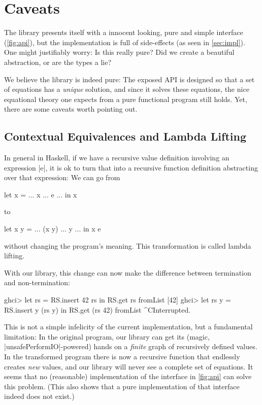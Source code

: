\documentclass[manuscript,screen,acmsmall,nonacm]{acmart}
\begin{document}
\section{Caveats}\label{sec:limitations}

The library presents itself with a innocent looking, pure and simple interface (\cref{fig:api}), but the implementation is full of side-effects (as seen in \cref{sec:impl}). One might justifiably worry: Is this really pure? Did we create a beautiful abstraction, or are the types a lie?

We believe the library is indeed pure: The exposed API is designed so that a set of equations has a \emph{unique} solution, and since it solves these equations, the nice equational theory one expects from a pure functional program still holds. Yet, there are some caveats worth pointing out.

\subsection{Contextual Equivalences and Lambda Lifting}\label{sec:lim-lambda-lift}

In general in Haskell, if we have a recursive value definition involving an expression |e|, it is ok to turn that into a recursive function definition abstracting over that expression: We can go from
\begin{code}
let x = ... x ... e ... in x
\end{code}
to
\begin{code}
let x y = ... (x y) ... y ... in x e
\end{code}
without changing the program's meaning. This transformation is called lambda lifting.

With our library, this change can now make the difference between termination and non-termination:
\begin{code}
ghci> let rs = RS.insert 42 rs in RS.get rs
fromList [42]
ghci> let rs y = RS.insert y (rs y) in RS.get (rs 42)
fromList ^CInterrupted.
\end{code}
This is not a simple infelicity of the current implementation, but a fundamental limitation: In the original program, our library can get its (magic, |unsafePerformIO|-powered) hands on a \emph{finite} graph of recursively defined values. In the transformed program there is now a recursive function that endlessly creates \emph{new} values, and our library will never see a complete set of equations. It seems that no (reasonable) implementation of the interface in \cref{fig:api} can solve this problem. (This also shows that a pure implementation of that interface indeed does not exist.)
\end{document}

